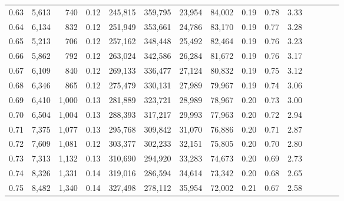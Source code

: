 \begin{tabular}{rrrcrrrrrrrrrrr}
0.63 &   5,613 &     740 &                                       0.12 &  245,815 &  359,795 &   23,954 &   84,002 &  0.19 &  0.78 &                         3.33 \\
0.64 &   6,134 &     832 &                                       0.12 &  251,949 &  353,661 &   24,786 &   83,170 &  0.19 &  0.77 &                         3.28 \\
0.65 &   5,213 &     706 &                                       0.12 &  257,162 &  348,448 &   25,492 &   82,464 &  0.19 &  0.76 &                         3.23 \\
0.66 &   5,862 &     792 &                                       0.12 &  263,024 &  342,586 &   26,284 &   81,672 &  0.19 &  0.76 &                         3.17 \\
0.67 &   6,109 &     840 &                                       0.12 &  269,133 &  336,477 &   27,124 &   80,832 &  0.19 &  0.75 &                         3.12 \\
0.68 &   6,346 &     865 &                                       0.12 &  275,479 &  330,131 &   27,989 &   79,967 &  0.19 &  0.74 &                         3.06 \\
0.69 &   6,410 &   1,000 &                                       0.13 &  281,889 &  323,721 &   28,989 &   78,967 &  0.20 &  0.73 &                         3.00 \\
0.70 &   6,504 &   1,004 &                                       0.13 &  288,393 &  317,217 &   29,993 &   77,963 &  0.20 &  0.72 &                         2.94 \\
0.71 &   7,375 &   1,077 &                                       0.13 &  295,768 &  309,842 &   31,070 &   76,886 &  0.20 &  0.71 &                         2.87 \\
0.72 &   7,609 &   1,081 &                                       0.12 &  303,377 &  302,233 &   32,151 &   75,805 &  0.20 &  0.70 &                         2.80 \\
0.73 &   7,313 &   1,132 &                                       0.13 &  310,690 &  294,920 &   33,283 &   74,673 &  0.20 &  0.69 &                         2.73 \\
0.74 &   8,326 &   1,331 &                                       0.14 &  319,016 &  286,594 &   34,614 &   73,342 &  0.20 &  0.68 &                         2.65 \\
0.75 &   8,482 &   1,340 &                                       0.14 &  327,498 &  278,112 &   35,954 &   72,002 &  0.21 &  0.67 &                         2.58 \\

\end{tabular}
